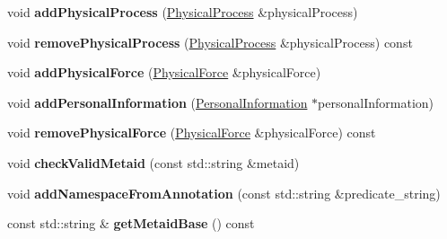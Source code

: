 \begin{DoxyCompactItemize}
\item 
\mbox{\label{classomexmeta_1_1Editor_ae4a608ecbe64f05c1b64efbeeb1fdeb1}} 
void {\bfseries add\+Physical\+Process} (\hyperlink{classomexmeta_1_1PhysicalProcess}{Physical\+Process} \&physical\+Process)
\item 
\mbox{\label{classomexmeta_1_1Editor_a42640d74c6afe780738c906bdf346a78}} 
void {\bfseries remove\+Physical\+Process} (\hyperlink{classomexmeta_1_1PhysicalProcess}{Physical\+Process} \&physical\+Process) const
\item 
\mbox{\label{classomexmeta_1_1Editor_a7833e03995f6323109c2db8d59104f6c}} 
void {\bfseries add\+Physical\+Force} (\hyperlink{classomexmeta_1_1PhysicalForce}{Physical\+Force} \&physical\+Force)
\item 
\mbox{\label{classomexmeta_1_1Editor_a1b2e0f5859fe2e2784ecff2a78f7f1f8}} 
void {\bfseries add\+Personal\+Information} (\hyperlink{classomexmeta_1_1PersonalInformation}{Personal\+Information} $\ast$personal\+Information)
\item 
\mbox{\label{classomexmeta_1_1Editor_ad99187ec52bef1af440af5d9560f32c5}} 
void {\bfseries remove\+Physical\+Force} (\hyperlink{classomexmeta_1_1PhysicalForce}{Physical\+Force} \&physical\+Force) const
\item 
\mbox{\label{classomexmeta_1_1Editor_a790458ef32f01ce0a6fd87bf14bed81a}} 
void {\bfseries check\+Valid\+Metaid} (const std\+::string \&metaid)
\item 
\mbox{\label{classomexmeta_1_1Editor_a3fef7f1c38949b50239a9a07cc327d67}} 
void {\bfseries add\+Namespace\+From\+Annotation} (const std\+::string \&predicate\+\_\+string)
\item 
\mbox{\label{classomexmeta_1_1Editor_af987e450e4bf9d75391ad3f5ac6233f6}} 
const std\+::string \& {\bfseries get\+Metaid\+Base} () const
\item 
\mbox{\label{classomexmeta_1_1Editor_a206feee18473abbeda5e4e55906e73eb}} 

\end{DoxyCompactItemize}
